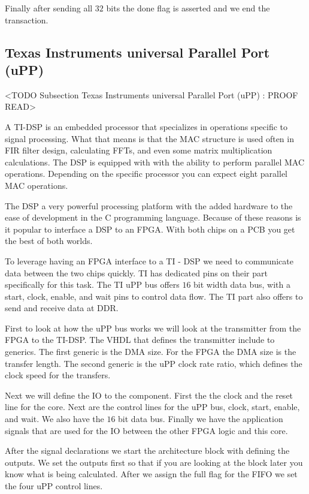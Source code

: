 Finally after sending all $32$ bits the done flag is asserted and we end the transaction. 
	
	
\subsection{Texas Instruments universal Parallel Port (uPP)}
	<TODO Subsection Texas Instruments universal Parallel Port (uPP) : PROOF READ>
	
A \ac{TI}-\ac{DSP} is an embedded processor that specializes in operations specific to signal processing. What that means is that the \ac{MAC} structure is used often in \ac{FIR} filter design, calculating \ac{FFT}s, and even some matrix multiplication calculations. The \ac{DSP} is equipped with with the ability to perform parallel \ac{MAC} operations. Depending on the specific processor you can expect eight parallel \ac{MAC} operations. 

The \ac{DSP} a very powerful processing platform with the added hardware to the ease of development in the C programming language. Because of these reasons is it popular to interface a \ac{DSP} to an \ac{FPGA}. With both chips on a \ac{PCB} you get the best of both worlds. 

To leverage having an \ac{FPGA} interface to a \ac{TI} - \ac{DSP} we need to communicate data between the two chips quickly. \ac{TI} has dedicated pins on their part specifically for this task. The \ac{TI} \ac{uPP} bus offers $16$ bit width data bus, with a start, clock, enable, and wait pins to control data flow. The \ac{TI} part also offers to send and receive data at \ac{DDR}. 

First to look at how the \ac{uPP} bus works we will look at the transmitter from the \ac{FPGA} to the \ac{TI}-\ac{DSP}. The \ac{VHDL} that defines the transmitter include to generics. The first generic is the \ac{DMA} size. For the \ac{FPGA} the \ac{DMA} size is the transfer length. The second generic is the \ac{uPP} clock rate ratio, which defines the clock speed for the transfers. 

Next we will define the \ac{IO} to the component. First the the clock and the reset line for the core. Next are the control lines for the \ac{uPP} bus, clock, start, enable, and wait. We also have the $16$ bit data bus. Finally we have the application signals that are used for the \ac{IO} between the other \ac{FPGA} logic and this core. 

After the signal declarations we start the architecture block with defining the outputs. We set the outputs first so that if you are looking at the block later you know what is being calculated. After we assign the full flag for the \ac{FIFO} we set the four \ac{uPP} control lines. 

